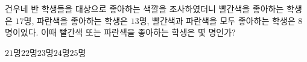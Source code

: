 건우네 반 학생들을 대상으로 좋아하는 색깔을 조사하였더니 빨간색을 좋아하는 학생은 $17$명, 파란색을 좋아하는 학생은 $13$명, 빨간색과 파란색을 모두 좋아하는 학생은 $8$명이었다. 이때 빨간색 또는 파란색을 좋아하는 학생은 몇 명인가?
\begin{choices32}{$21$명}{$22$명}{$23$명}{$24$명}{$25$명}\end{choices32}
